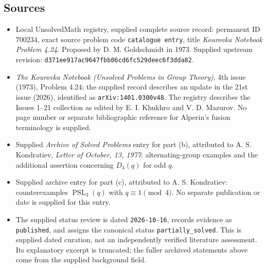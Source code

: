 \documentclass[11pt]{article}
\begin{document}
\subsection{Sources}
\begin{itemize}
\item Local UnsolvedMath registry, supplied complete source record: permanent ID \(700234\), exact source problem code \texttt{catalogue entry}, title \emph{Kourovka Notebook Problem 4.24}. Proposed by D. M. Goldschmidt in 1973. Supplied upstream revision: \texttt{d371ee917ac9647fbb06cd6fc529deec6f3dda82}.
\item \emph{The Kourovka Notebook (Unsolved Problems in Group Theory)}, 4th issue (1973), Problem 4.24; the supplied record describes an update in the 21st issue (2026), identified as \texttt{arXiv:1401.0300v48}. The registry describes the Issues 1--21 collection as edited by E. I. Khukhro and V. D. Mazurov. No page number or separate bibliographic reference for Alperin's fusion terminology is supplied.
\item Supplied \emph{Archive of Solved Problems} entry for part (b), attributed to A. S. Kondratiev, \emph{Letter of October, 13, 1977}: alternating-group examples and the additional assertion concerning \(D_4(q)\) for odd \(q\).
\item Supplied archive entry for part (c), attributed to A. S. Kondratiev: counterexamples \(\operatorname{PSL}_3(q)\) with \(q\equiv 1\pmod 4\). No separate publication or date is supplied for this entry.
\item The supplied status review is dated \texttt{2026-10-16}, records evidence as \texttt{published}, and assigns the canonical status \texttt{partially\_solved}. This is supplied dated curation, not an independently verified literature assessment. Its explanatory excerpt is truncated; the fuller archived statements above come from the supplied background field.
\end{itemize}
\end{document}
